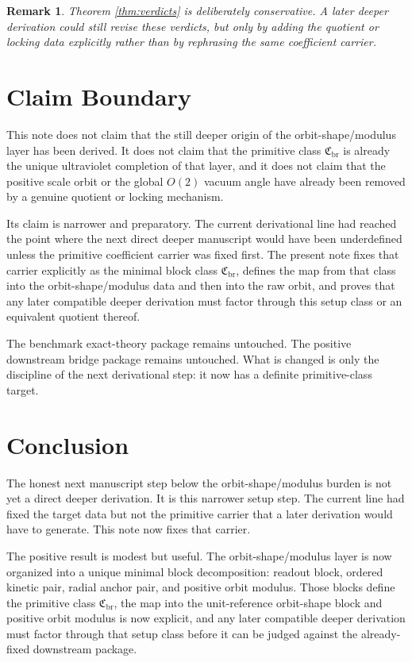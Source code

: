 \documentclass[11pt]{article}
\newcommand{\PrimClass}{\mathfrak C_{\mathrm{br}}}
\newtheorem{remark}{Remark}
\begin{document}
\begin{remark}
Theorem \ref{thm:verdicts} is deliberately conservative. A later deeper derivation could still revise these verdicts, but only by adding the quotient or locking data explicitly rather than by rephrasing the same coefficient carrier.
\end{remark}

\section{Claim Boundary}

This note does not claim that the still deeper origin of the orbit-shape/modulus layer has been derived. It does not claim that the primitive class \(\PrimClass\) is already the unique ultraviolet completion of that layer, and it does not claim that the positive scale orbit or the global \(O(2)\) vacuum angle have already been removed by a genuine quotient or locking mechanism.

Its claim is narrower and preparatory. The current derivational line had reached the point where the next direct deeper manuscript would have been underdefined unless the primitive coefficient carrier was fixed first. The present note fixes that carrier explicitly as the minimal block class \(\PrimClass\), defines the map from that class into the orbit-shape/modulus data and then into the raw orbit, and proves that any later compatible deeper derivation must factor through this setup class or an equivalent quotient thereof.

The benchmark exact-theory package remains untouched. The positive downstream bridge package remains untouched. What is changed is only the discipline of the next derivational step: it now has a definite primitive-class target.

\section{Conclusion}

The honest next manuscript step below the orbit-shape/modulus burden is not yet a direct deeper derivation. It is this narrower setup step. The current line had fixed the target data but not the primitive carrier that a later derivation would have to generate. This note now fixes that carrier.

The positive result is modest but useful. The orbit-shape/modulus layer is now organized into a unique minimal block decomposition: readout block, ordered kinetic pair, radial anchor pair, and positive orbit modulus. Those blocks define the primitive class \(\PrimClass\), the map into the unit-reference orbit-shape block and positive orbit modulus is now explicit, and any later compatible deeper derivation must factor through that setup class before it can be judged against the already-fixed downstream package.
\end{document}
